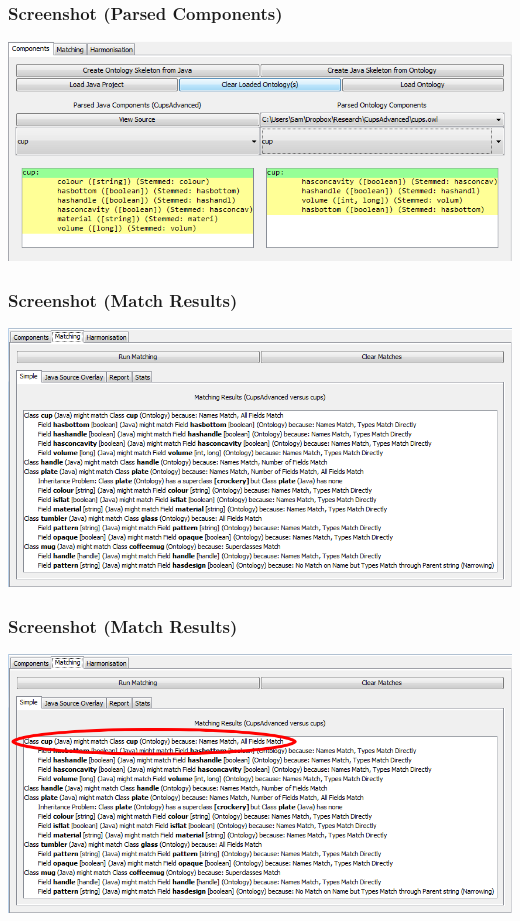 \documentclass{beamer}
\begin{document}
\begin{frame}
\frametitle{Screenshot (Parsed Components)}
\centerline{\includegraphics[width=\paperwidth]{ComponentsScreen}}
\end{frame}

\begin{frame}
\frametitle{Screenshot (Match Results)}
\centerline{\includegraphics[width=\paperwidth]{MatchingScreen}}
\end{frame}

\begin{frame}
\frametitle{Screenshot (Match Results)}
\centerline{\includegraphics[width=\paperwidth]{MatchingScreen-ClassHighlight}}
\end{frame}
\end{document}
